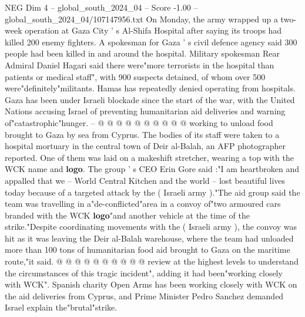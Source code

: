 \begin{textsample}{NEG Dim 4 – global\_south\_2024\_04 – Score -1.00 – global\_south\_2024\_04/107147956.txt}
On Monday, the army wrapped up a two-week operation at Gaza City ' s Al-Shifa Hospital after saying its troops had killed 200 enemy fighters.
A spokesman for Gaza ' s civil defence agency said 300 people had been killed in and around the hospital.
Military spokesman Rear Admiral Daniel Hagari said there were"more terrorists in the hospital than patients or medical staff", with 900 suspects detained, of whom over 500 were"definitely"militants.
Hamas has repeatedly denied operating from hospitals.
Gaza has been under Israeli blockade since the start of the war, with the United Nations accusing Israel of preventing humanitarian aid deliveries and warning of"catastrophic"hunger. -- @ @ @ @ @ @ @ @ @ @ working to unload food brought to Gaza by sea from Cyprus.
The bodies of its staff were taken to a hospital mortuary in the central town of Deir al-Balah, an AFP photographer reported.
One of them was laid on a makeshift stretcher, wearing a top with the WCK name and \textbf{logo}.
The group ' s CEO Erin Gore said :"I am heartbroken and appalled that we -- World Central Kitchen and the world -- lost beautiful lives today because of a targeted attack by the ( Israeli army )."The aid group said the team was travelling in a"de-conflicted"area in a convoy of"two armoured cars branded with the WCK \textbf{logo}"and another vehicle at the time of the strike."Despite coordinating movements with the ( Israeli army ), the convoy was hit as it was leaving the Deir al-Balah warehouse, where the team had unloaded more than 100 tons of humanitarian food aid brought to Gaza on the maritime route,"it said. @ @ @ @ @ @ @ @ @ @ review at the highest levels to understand the circumstances of this tragic incident", adding it had been"working closely with WCK".
Spanish charity Open Arms has been working closely with WCK on the aid deliveries from Cyprus, and Prime Minister Pedro Sanchez demanded Israel explain the"brutal"strike.

\end{textsample}
